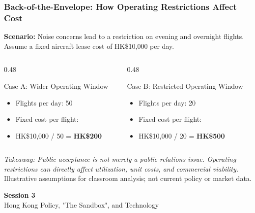 \documentclass{beamer}
\begin{document}
\begin{frame}[t, shrink=10]
  \frametitle{Back-of-the-Envelope: How Operating Restrictions Affect Cost}
  \textbf{Scenario:} Noise concerns lead to a restriction on evening and overnight flights. Assume a fixed aircraft lease cost of HK\$10,000 per day.
  \begin{columns}[T]
    \begin{column}{0.48\textwidth}
      \begin{block}{Case A: Wider Operating Window}
      \begin{itemize}
        \item Flights per day: 50
        \item Fixed cost per flight:
        \item HK\$10,000 / 50 = \textbf{HK\$200}
      \end{itemize}
      \end{block}
    \end{column}
    \begin{column}{0.48\textwidth}
      \begin{block}{Case B: Restricted Operating Window}
      \begin{itemize}
        \item Flights per day: 20
        \item Fixed cost per flight:
        \item HK\$10,000 / 20 = \textbf{HK\$500}
      \end{itemize}
      \end{block}
    \end{column}
  \end{columns}
  \vspace{0.25cm}
  \textit{Takeaway: Public acceptance is not merely a public-relations issue. Operating restrictions can directly affect utilization, unit costs, and commercial viability.}
  \vfill
  {\tiny Illustrative assumptions for classroom analysis; not current policy or market data.}
\end{frame}

\begin{frame}[c]
  \begin{center}
    \huge\color{cuhkpurple}\textbf{Session 3}\\
    \vspace{0.5cm}
    \Large Hong Kong Policy, "The Sandbox", and Technology
  \end{center}
\end{frame}
\end{document}
